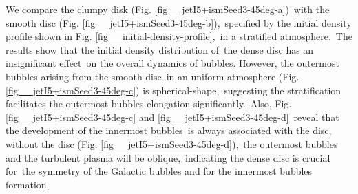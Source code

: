 \documentclass[fleqn,usenatbib,useAMS]{mnras}
\begin{document}
 We compare the clumpy disk (Fig. \ref{fig__jetI5+ismSeed3-45deg-a})\
 with the smooth disc (Fig. \ref{fig__jetI5+ismSeed3-45deg-b}),\
 specified by the initial density profile shown in Fig. \ref{fig__initial-density-profile},\
 in a stratified atmosphere.\
 The results show that the initial density distribution of\
 the dense disc has an insignificant effect\
 on the overall dynamics of bubbles. However, the outermost bubbles arising from the smooth disc\
 in an uniform atmosphere (Fig. \ref{fig__jetI5+ismSeed3-45deg-c}) is spherical-shape,\
 suggesting the stratification facilitates the outermost bubbles elongation significantly.\
 Also, Fig. \ref{fig__jetI5+ismSeed3-45deg-c} and \ref{fig__jetI5+ismSeed3-45deg-d}\
 reveal that the development of the innermost bubbles\
 is always associated with the disc, without the disc (Fig. \ref{fig__jetI5+ismSeed3-45deg-d}),\
 the outermost bubbles and the turbulent plasma will be oblique,\
 indicating the dense disc is crucial for\
 the symmetry of the Galactic bubbles and for the innermost bubbles formation.
\end{document}

